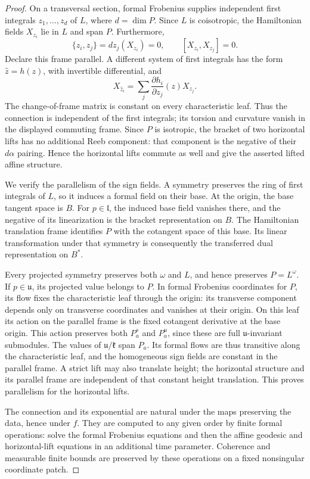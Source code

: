 \begin{proof}
On a transversal section, formal Frobenius supplies independent first
integrals $z_1,\ldots,z_d$ of $L$, where $d=\dim P$. Since $L$ is
coisotropic, the Hamiltonian fields $X_{z_i}$ lie in $L$ and span
$P$. Furthermore,
\[
 \{z_i,z_j\}=dz_j(X_{z_i})=0,
 \qquad [X_{z_i},X_{z_j}]=0.
\]
Declare this frame parallel. A different system of first integrals
has the form $\widehat z=h(z)$, with invertible differential, and
\[
 X_{\widehat z_i}
   =\sum_j \frac{\partial h_i}{\partial z_j}(z)X_{z_j}.
\]
The change-of-frame matrix is constant on every characteristic leaf.
Thus the connection is independent of the first integrals; its
torsion and curvature vanish in the displayed commuting frame.
Since $P$ is isotropic, the bracket of two horizontal lifts has no
additional Reeb component: that component is the negative of their
$d\alpha$ pairing. Hence the horizontal lifts commute as well and
give the asserted lifted affine structure.

We verify the parallelism of the sign fields. A symmetry preserves
the ring of first integrals of $L$, so it induces a formal field on
their base. At the origin, the base tangent space is $B$. For
$p\in\mathfrak l$, the induced base field vanishes there, and the
negative of its linearization is the bracket representation on $B$.
The Hamiltonian translation
frame identifies $P$ with the cotangent space of this base. Its
linear transformation under that symmetry is consequently the
transferred dual representation on $B^*$.

Every projected symmetry preserves both $\omega$ and $L$, and hence
preserves $P=L^\omega$. If $p\in\mathfrak u$, its projected value
belongs to $P$. In formal Frobenius coordinates for $P$, its flow fixes the
characteristic leaf through the origin: its transverse component
depends only on transverse coordinates and vanishes at their origin.
On this leaf its action on the parallel frame is the fixed
cotangent derivative at the base origin. This action preserves both
$P^s_a$ and $P^u_a$, since these are full
$\mathfrak u$-invariant submodules. The values of
$\mathfrak u/\mathfrak k$ span $P_a$. Its formal flows are thus
transitive along the characteristic leaf, and the homogeneous sign
fields are constant in the parallel frame. A strict lift may also
translate height; the horizontal structure and its parallel frame
are independent of that constant height translation. This proves
parallelism for the horizontal lifts.

The connection and its exponential are natural under the maps
preserving the data, hence under $f$. They are computed to any given
order by finite formal operations: solve the formal Frobenius
equations and then the affine geodesic and horizontal-lift equations
in an additional time parameter. Coherence and measurable finite
bounds are preserved by these operations on a fixed nonsingular
coordinate patch.


\end{proof}
